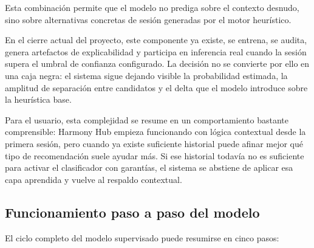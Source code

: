 Esta combinación permite que el modelo no prediga sobre el contexto desnudo,
sino sobre alternativas concretas de sesión generadas por el motor heurístico.

En el cierre actual del proyecto, este componente ya existe, se entrena, se
audita, genera artefactos de explicabilidad y participa en inferencia real
cuando la sesión supera el umbral de confianza configurado. La decisión no se
convierte por ello en una caja negra: el sistema sigue dejando visible la
probabilidad estimada, la amplitud de separación entre candidatos y el delta
que el modelo introduce sobre la heurística base.

Para el usuario, esta complejidad se resume en un comportamiento bastante
comprensible: Harmony Hub empieza funcionando con lógica contextual desde la
primera sesión, pero cuando ya existe suficiente historial puede afinar mejor
qué tipo de recomendación suele ayudar más. Si ese historial todavía no es
suficiente para activar el clasificador con garantías, el sistema se abstiene
de aplicar esa capa aprendida y vuelve al respaldo contextual.

\subsection{Funcionamiento paso a paso del modelo}

El ciclo completo del modelo supervisado puede resumirse en cinco pasos:


